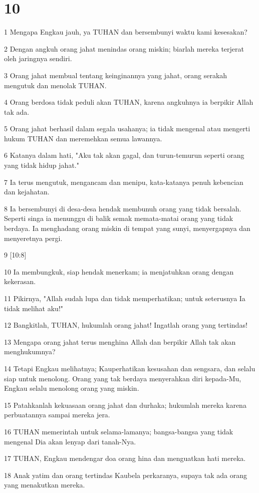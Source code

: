 \chapter{10}

\par 1 Mengapa Engkau jauh, ya TUHAN dan bersembunyi waktu kami kesesakan?
\par 2 Dengan angkuh orang jahat menindas orang miskin; biarlah mereka terjerat oleh jaringnya sendiri.
\par 3 Orang jahat membual tentang keinginannya yang jahat, orang serakah mengutuk dan menolak TUHAN.
\par 4 Orang berdosa tidak peduli akan TUHAN, karena angkuhnya ia berpikir Allah tak ada.
\par 5 Orang jahat berhasil dalam segala usahanya; ia tidak mengenal atau mengerti hukum TUHAN dan meremehkan semua lawannya.
\par 6 Katanya dalam hati, "Aku tak akan gagal, dan turun-temurun seperti orang yang tidak hidup jahat."
\par 7 Ia terus mengutuk, mengancam dan menipu, kata-katanya penuh kebencian dan kejahatan.
\par 8 Ia bersembunyi di desa-desa hendak membunuh orang yang tidak bersalah. Seperti singa ia menunggu di balik semak memata-matai orang yang tidak berdaya. Ia menghadang orang miskin di tempat yang sunyi, menyergapnya dan menyeretnya pergi.
\par 9 [10:8]
\par 10 Ia membungkuk, siap hendak menerkam; ia menjatuhkan orang dengan kekerasan.
\par 11 Pikirnya, "Allah sudah lupa dan tidak memperhatikan; untuk seterusnya Ia tidak melihat aku!"
\par 12 Bangkitlah, TUHAN, hukumlah orang jahat! Ingatlah orang yang tertindas!
\par 13 Mengapa orang jahat terus menghina Allah dan berpikir Allah tak akan menghukumnya?
\par 14 Tetapi Engkau melihatnya; Kauperhatikan kesusahan dan sengsara, dan selalu siap untuk menolong. Orang yang tak berdaya menyerahkan diri kepada-Mu, Engkau selalu menolong orang yang miskin.
\par 15 Patahkanlah kekuasaan orang jahat dan durhaka; hukumlah mereka karena perbuatannya sampai mereka jera.
\par 16 TUHAN memerintah untuk selama-lamanya; bangsa-bangsa yang tidak mengenal Dia akan lenyap dari tanah-Nya.
\par 17 TUHAN, Engkau mendengar doa orang hina dan menguatkan hati mereka.
\par 18 Anak yatim dan orang tertindas Kaubela perkaranya, supaya tak ada orang yang menakutkan mereka.


